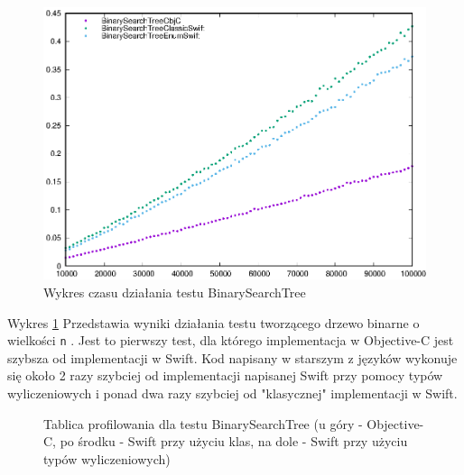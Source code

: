 \documentclass[mgr, shortabstract]{iithesis}
\newcommand{\swiftinline}[1]{
    \texttt{#1}
}
\begin{document}
\begin{figure}
    \includegraphics{plots/BinarySearchTree.eps}
    \caption{Wykres czasu działania testu BinarySearchTree}
    \label{p:binary_search}
\end{figure}

Wykres \ref{p:binary_search} Przedstawia wyniki działania testu tworzącego drzewo binarne o wielkości \swiftinline{n}. Jest to pierwszy test, dla którego implementacja w Objective-C jest szybsza od implementacji w Swift. Kod napisany w starszym z języków wykonuje się około 2 razy szybciej od implementacji napisanej Swift przy pomocy typów wyliczeniowych i ponad dwa razy szybciej od "klasycznej" implementacji w Swift. 

\begin{figure}
    \caption{Tablica profilowania dla testu BinarySearchTree (u góry - Objective-C, po środku - Swift przy użyciu klas, na dole - Swift przy użyciu typów wyliczeniowych)}
    \label{i:binary_search}
\end{figure}
\end{document}
